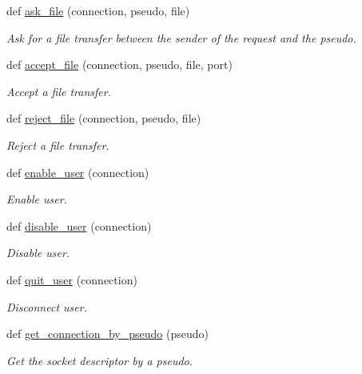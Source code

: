 \begin{DoxyCompactItemize}
def \hyperlink{namespaceserveur_1_1_server_a7220418c66856209858c366fcdefa91b}{ask\+\_\+file} (connection, pseudo, file)
\begin{DoxyCompactList}\small\item\em Ask for a file transfer between the sender of the request and the pseudo. \end{DoxyCompactList}\item 
def \hyperlink{namespaceserveur_1_1_server_a45bcce6e97e0e182908b70b388fcffe3}{accept\+\_\+file} (connection, pseudo, file, port)
\begin{DoxyCompactList}\small\item\em Accept a file transfer. \end{DoxyCompactList}\item 
def \hyperlink{namespaceserveur_1_1_server_a8cf6fc7cdac024fded57580916e129da}{reject\+\_\+file} (connection, pseudo, file)
\begin{DoxyCompactList}\small\item\em Reject a file transfer. \end{DoxyCompactList}\item 
def \hyperlink{namespaceserveur_1_1_server_a89251bb74b7d097111767d047e41a589}{enable\+\_\+user} (connection)
\begin{DoxyCompactList}\small\item\em Enable user. \end{DoxyCompactList}\item 
def \hyperlink{namespaceserveur_1_1_server_ac11fb7270de13c531e636e7614e85dc7}{disable\+\_\+user} (connection)
\begin{DoxyCompactList}\small\item\em Disable user. \end{DoxyCompactList}\item 
def \hyperlink{namespaceserveur_1_1_server_aabf56827aa7e57c8f7d98f93380eb322}{quit\+\_\+user} (connection)
\begin{DoxyCompactList}\small\item\em Disconnect user. \end{DoxyCompactList}\item 
def \hyperlink{namespaceserveur_1_1_server_a82bca8859619cc604e59e53bb1b6d074}{get\+\_\+connection\+\_\+by\+\_\+pseudo} (pseudo)
\begin{DoxyCompactList}\small\item\em Get the socket descriptor by a pseudo. \end{DoxyCompactList}\end{DoxyCompactItemize}
